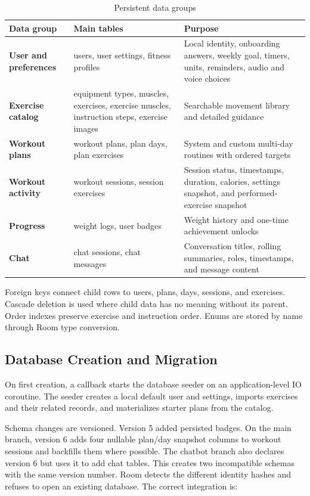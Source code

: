 \begin{table}[ht]
\centering
\caption{Persistent data groups}
\label{tab:data-groups}
\begin{tabularx}{\textwidth}{>{\raggedright\arraybackslash\bfseries}p{} >{\raggedright\arraybackslash}p{} >{\raggedright\arraybackslash}X}
\toprule
Data group & Main tables & Purpose \\
\midrule
User and preferences & users, user settings, fitness profiles & Local identity, onboarding answers, weekly goal, timers, units, reminders, audio and voice choices \\
Exercise catalog & equipment types, muscles, exercises, exercise muscles, instruction steps, exercise images & Searchable movement library and detailed guidance \\
Workout plans & workout plans, plan days, plan exercises & System and custom multi-day routines with ordered targets \\
Workout activity & workout sessions, session exercises & Session status, timestamps, duration, calories, settings snapshot, and performed-exercise snapshot \\
Progress & weight logs, user badges & Weight history and one-time achievement unlocks \\
Chat & chat sessions, chat messages & Conversation titles, rolling summaries, roles, timestamps, and message content \\
\bottomrule
\end{tabularx}
\end{table}

Foreign keys connect child rows to users, plans, days, sessions, and exercises. Cascade deletion is used where child data has no meaning without its parent. Order indexes preserve exercise and instruction order. Enums are stored by name through Room type conversion.

\subsection{Database Creation and Migration}

On first creation, a callback starts the database seeder on an application-level IO coroutine. The seeder creates a local default user and settings, imports exercises and their related records, and materializes starter plans from the catalog.

Schema changes are versioned. Version 5 added persisted badges. On the main branch, version 6 adds four nullable plan/day snapshot columns to workout sessions and backfills them where possible. The chatbot branch also declares version 6 but uses it to add chat tables. This creates two incompatible schemas with the same version number. Room detects the different identity hashes and refuses to open an existing database. The correct integration is:

